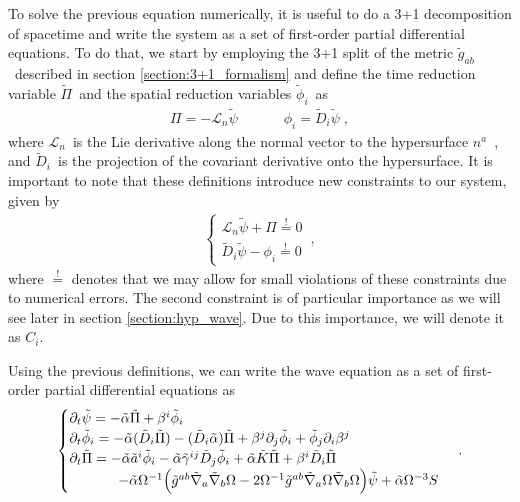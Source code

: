 To solve the previous equation numerically, it is useful to do a 3+1 decomposition of spacetime and write the system as a set of first-order partial differential equations. To do that, we start by employing the 3+1 split of the metric $\tilde{g}_{ab}$~described in section \ref{section:3+1_formalism} and define the time reduction variable $\tilde{\Pi}$~and the spatial reduction variables $\tilde{\phi}_i$~as
%
\begin{align}
    \Pi = - \mathcal{L}_n \tilde{\psi} \;  \quad \quad \quad \phi_i = \tilde{D}_i \tilde{\psi} \; ,
\end{align}
%
where $\mathcal{L}_n$~is the Lie derivative along the normal vector to the hypersurface $n^a$~, and $\tilde{D}_i$~is the projection of the covariant derivative onto the hypersurface. It is important to note that these definitions introduce new constraints to our system, given by
%
\begin{align}
    \begin{cases}
        \mathcal{L}_n \tilde{\psi} + \Pi \overset{!}{=} 0 \\
        \tilde{D}_i \tilde{\psi} - \phi_i \overset{!}{=} 0
    \end{cases}\,,
\end{align}
%
where $\overset{!}{=}$ denotes that we may allow for small violations of these constraints due to numerical errors. The second constraint is of particular importance as we will see later in section \ref{section:hyp_wave}. Due to this importance, we will denote it as $C_i$.

Using the previous definitions, we can write the wave equation as a set of first-order partial differential equations as
%
\begin{align}
    \begin{cases}
        \partial_t \tilde{\psi} = - \tilde{\alpha} \tilde{\Pi} + \beta^i \tilde{\phi}_i \\
        \partial_t \tilde{\phi}_i = - \tilde{\alpha} (\tilde{D}_i \tilde{\Pi}) - (\tilde{D}_i \tilde{\alpha}) \tilde{\Pi} + \beta^j \partial_j \tilde{\phi}_i + \tilde{\phi}_j \partial_i \beta^j \\
        \partial_t \tilde{\Pi} = - \tilde{\alpha} \tilde{a}^i \tilde{\phi}_i - \tilde{\alpha} \tilde{\gamma}^{ij} \tilde{D}_j \tilde{\phi}_i + \tilde{\alpha} \tilde{K} \tilde{\Pi} + \beta^i \tilde{D}_i \tilde{\Pi} \\
        \hspace{3.5em} - \tilde{\alpha} \Omega^{-1} \Big( \tilde{g}^{ab} \tilde{\nabla}_a \tilde{\nabla}_b \Omega - 2 \Omega^{-1} \tilde{g}^{ab} \tilde{\nabla}_a \Omega \tilde{\nabla}_b \Omega \Big) \tilde{\psi} + \tilde{\alpha} \Omega^{-3} S
    \end{cases}\,.
    \label{eq:wave_equation_3+1}
\end{align}

